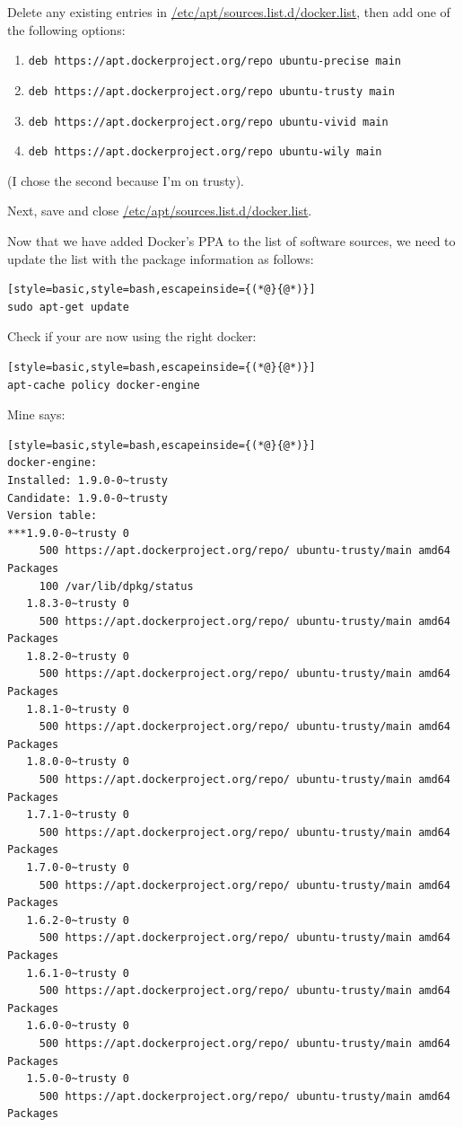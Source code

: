 \documentclass[12pt, a4paper, twoside, openany, titlepage]{book}
\begin{document}
Delete any existing entries in \url{/etc/apt/sources.list.d/docker.list}, then add one of the following options:
\begin{enumerate}
\item{\texttt{deb https://apt.dockerproject.org/repo ubuntu-precise main}}
\item{\texttt{deb https://apt.dockerproject.org/repo ubuntu-trusty main}}
\item{\texttt{deb https://apt.dockerproject.org/repo ubuntu-vivid main}}
\item{\texttt{deb https://apt.dockerproject.org/repo ubuntu-wily main}}
\end{enumerate}
(I chose the second because I'm on trusty).

Next, save and close \url{/etc/apt/sources.list.d/docker.list}.

Now that we have added Docker's PPA to the list of software sources, we need to update the list with the package information as follows:
\begin{lstlisting}[style=basic,style=bash,escapeinside={(*@}{@*)}]
sudo apt-get update
\end{lstlisting}

Check if your are now using the right docker:
\begin{lstlisting}[style=basic,style=bash,escapeinside={(*@}{@*)}]
apt-cache policy docker-engine
\end{lstlisting}
Mine says:
\begin{lstlisting}[style=basic,style=bash,escapeinside={(*@}{@*)}]
docker-engine:
Installed: 1.9.0-0~trusty
Candidate: 1.9.0-0~trusty
Version table:
***1.9.0-0~trusty 0
     500 https://apt.dockerproject.org/repo/ ubuntu-trusty/main amd64 Packages
     100 /var/lib/dpkg/status
   1.8.3-0~trusty 0
     500 https://apt.dockerproject.org/repo/ ubuntu-trusty/main amd64 Packages
   1.8.2-0~trusty 0
     500 https://apt.dockerproject.org/repo/ ubuntu-trusty/main amd64 Packages
   1.8.1-0~trusty 0
     500 https://apt.dockerproject.org/repo/ ubuntu-trusty/main amd64 Packages
   1.8.0-0~trusty 0
     500 https://apt.dockerproject.org/repo/ ubuntu-trusty/main amd64 Packages
   1.7.1-0~trusty 0
     500 https://apt.dockerproject.org/repo/ ubuntu-trusty/main amd64 Packages
   1.7.0-0~trusty 0
     500 https://apt.dockerproject.org/repo/ ubuntu-trusty/main amd64 Packages
   1.6.2-0~trusty 0
     500 https://apt.dockerproject.org/repo/ ubuntu-trusty/main amd64 Packages
   1.6.1-0~trusty 0
     500 https://apt.dockerproject.org/repo/ ubuntu-trusty/main amd64 Packages
   1.6.0-0~trusty 0
     500 https://apt.dockerproject.org/repo/ ubuntu-trusty/main amd64 Packages
   1.5.0-0~trusty 0
     500 https://apt.dockerproject.org/repo/ ubuntu-trusty/main amd64 Packages
\end{lstlisting}
\end{document}
